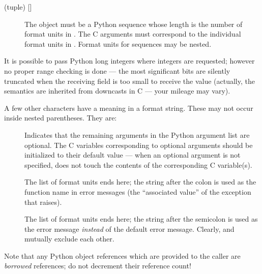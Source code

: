 \begin{description}
  \item[ (tuple) {[]}]
  The object must be a Python sequence whose length is the number of
  format units in .  The C arguments must correspond to the
  individual format units in .  Format units for sequences
  may be nested.

\end{description}

It is possible to pass Python long integers where integers are
requested; however no proper range checking is done --- the most
significant bits are silently truncated when the receiving field is
too small to receive the value (actually, the semantics are inherited
from downcasts in C --- your mileage may vary).

A few other characters have a meaning in a format string.  These may
not occur inside nested parentheses.  They are:

\begin{description}
  \item[\samp{|}]
  Indicates that the remaining arguments in the Python argument list
  are optional.  The C variables corresponding to optional arguments
  should be initialized to their default value --- when an optional
  argument is not specified,  does not
  touch the contents of the corresponding C variable(s).

  \item[\samp{:}]
  The list of format units ends here; the string after the colon is
  used as the function name in error messages (the ``associated
  value'' of the exception that 
  raises).

  \item[\samp{;}]
  The list of format units ends here; the string after the semicolon
  is used as the error message \emph{instead} of the default error
  message.  Clearly, \samp{:} and \samp{;} mutually exclude each
  other.
\end{description}

Note that any Python object references which are provided to the
caller are \emph{borrowed} references; do not decrement their
reference count!

